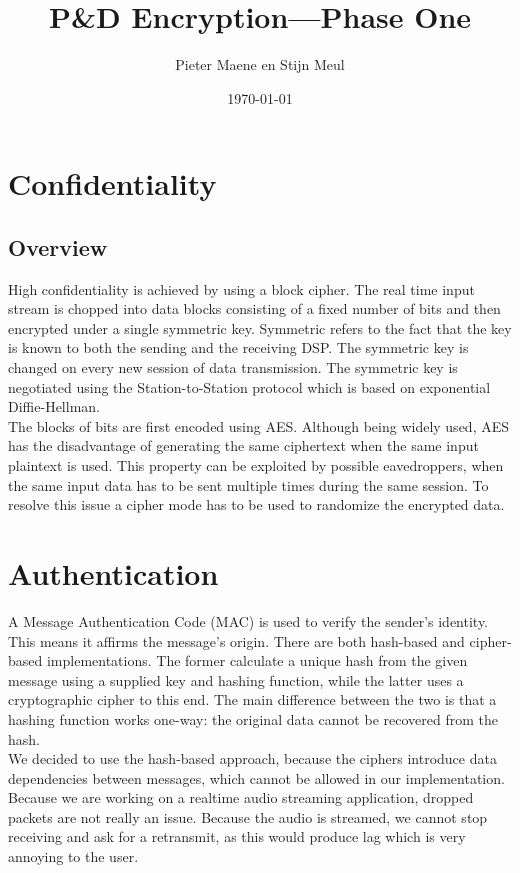 \documentclass[a4paper]{article}
\title{P\&D Encryption---Phase One}
\author{Pieter Maene en Stijn Meul}
\date{\today}
\begin{document}
\maketitle

\section{Confidentiality}

\subsection{Overview}
High confidentiality is achieved by using a block cipher. The real time input stream is chopped into data blocks consisting of a fixed number of bits and then encrypted under a single symmetric key. Symmetric refers to the fact that the key is known to both the sending and the receiving DSP. The symmetric key is changed on every new session of data transmission. The symmetric key is negotiated using the Station-to-Station protocol which is based on exponential Diffie-Hellman.\\

The blocks of bits are first encoded using AES. Although being widely used, AES has the disadvantage of generating the same ciphertext when the same input plaintext is used. This property can be exploited by possible eavedroppers, when the same input data has to be sent multiple times during the same session. To resolve this issue a cipher mode has to be used to randomize the encrypted data. 

\section{Authentication}

A Message Authentication Code (MAC) is used to verify the sender's identity. This means it affirms the message's origin. There are both hash-based and cipher-based implementations. The former calculate a unique hash from the given message using a supplied key and hashing function, while the latter uses a cryptographic cipher to this end. The main difference between the two is that a hashing function works one-way: the original data cannot be recovered from the hash.\\

We decided to use the hash-based approach, because the ciphers introduce data dependencies between messages, which cannot be allowed in our implementation. Because we are working on a realtime audio streaming application, dropped packets are not really an issue. Because the audio is streamed, we cannot stop receiving and ask for a retransmit, as this would produce lag which is very annoying to the user.\\
\end{document}
